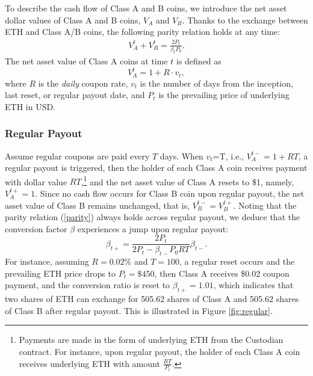 \documentclass[draft, noinfoline]{ectaart}
\numberwithin{equation}{section}
\theoremstyle{plain}
\begin{document}
To describe the cash flow of Class A and B coins, we introduce the net asset dollar values of Class A and B coins, $V_A$ and $V_B$. Thanks to the exchange between ETH and Class A/B coins, the following parity relation holds at any time:
\begin{eqnarray}
\label{parity}
V_{A}^{t}+V_{B}^{t}=\frac{2P_{t}}{\beta_tP_{0}}.
\end{eqnarray}
The net asset value of Class A coins at time $t$ is defined as 
\begin{equation}
V_{A}^{t}= 1+R\cdot v_t, \label{eq:netvalue}
\end{equation}
where $R$ is the \emph{daily} coupon rate, $v_t$ is the number of days from the inception, last reset, or regular payout date, and $P_{t}$ is the prevailing price of underlying ETH in USD.

\subsubsection{Regular Payout}
Assume regular coupons are paid every $T$ days. When $v_t$=T, i.e., $V_{A}^{t-}=1+RT$, a regular payout is triggered, then the holder of each Class A coin receives payment with dollar value $RT$,\footnote{Payments are made in the form of underlying ETH from the Custodian contract. For instance, upon regular payout, the holder of each Class A coin receives underlying ETH with amount $\frac{RT}{P_{t}}$.}
 and the net asset value of Class A resets to \$1, namely, $V_{A}^{t+}=1$. Since no cash flow occurs for Class B coin upon regular payout, the net asset value of Class B remains unchanged, that is, $V_{B}^{t-}=V_{B}^{t+}$. Noting that the parity relation (\ref{parity}) always holds across regular payout, we deduce that the conversion factor $\beta$ experiences a jump upon regular payout:  $$\beta_{t+}=\frac{2P_{t}}{2P_{t}-\beta_{t-}P_{0} RT}\beta_{t-}.$$ For instance, assuming $R=0.02\%$ and $T=100$, a regular reset occurs and the prevailing ETH price drops to $P_t=\$450$, then Class A receives \$0.02 coupon payment, and the conversion ratio is reset to $\beta_{t+}=1.01$, which indicates that two shares of ETH can exchange for 505.62 shares of Class A and 505.62 shares of Class B after regular payout. This is illustrated in Figure \ref{fig:regular}.
\end{document}
